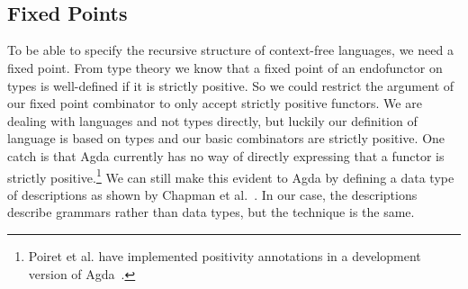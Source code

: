 \begin{code}[hide]
\AgdaSpace{}%
\<%
\\
%
\\[\AgdaEmptyExtraSkip]%
\>[0]\AgdaSpace{}%
\AgdaSpace{}%
\AgdaSpace{}%
\AgdaSpace{}%
\AgdaSymbol{(}\AgdaSpace{}%
\AgdaSpace{}%
\AgdaSpace{}%
\AgdaSymbol{;}\AgdaSpace{}%
\AgdaSpace{}%
\AgdaSpace{}%
\AgdaSpace{}%
\AgdaSymbol{;}\AgdaSpace{}%
\AgdaSpace{}%
\AgdaSpace{}%
\AgdaSpace{}%
\AgdaSymbol{;}\AgdaSpace{}%
\AgdaSpace{}%
\AgdaSpace{}%
\AgdaSpace{}%
\AgdaSymbol{;}\AgdaSpace{}%
\AgdaSpace{}%
\AgdaSpace{}%
\AgdaSpace{}%
\AgdaSymbol{;}\AgdaSpace{}%
\AgdaSpace{}%
\AgdaSpace{}%
\AgdaSymbol{)}\AgdaSpace{}%
\AgdaSpace{}%
\AgdaSymbol{(}\AgdaSpace{}%
\AgdaSymbol{;}\AgdaSpace{}%
\AgdaSymbol{)}\<%
\end{code}

\subsection{Fixed Points}

To be able to specify the recursive structure of context-free languages, we need a fixed point.
From type theory we know that a fixed point of an endofunctor on types is well-defined if it is strictly positive.
So we could restrict the argument of our fixed point combinator to only accept strictly positive functors.
We are dealing with languages and not types directly, but luckily our definition of language is based on types and our basic combinators are strictly positive.
One catch is that Agda currently has no way of directly expressing that a functor is strictly positive.\footnote{Poiret et al. have implemented positivity annotations in a development version of Agda~\cite{positivity}.}
We can still make this evident to Agda by defining a data type of descriptions as shown by Chapman et al.~\cite{levitation}. 
In our case, the descriptions describe grammars rather than data types, but the technique is the same.

